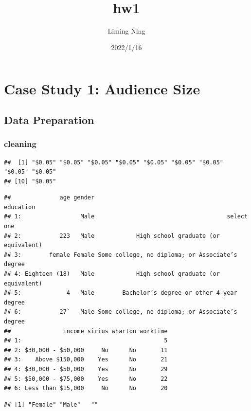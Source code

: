 \documentclass[
  12pt,
]{article}
\title{hw1}
\author{Liming Ning}
\date{2022/1/16}
\begin{document}
\maketitle

{
\setcounter{tocdepth}{2}
\tableofcontents
}
\hypertarget{case-study-1-audience-size}{%
\section{Case Study 1: Audience Size}\label{case-study-1-audience-size}}

\hypertarget{data-preparation}{%
\subsection{Data Preparation}\label{data-preparation}}

\hypertarget{cleaning}{%
\subsubsection{cleaning}\label{cleaning}}

\begin{verbatim}
##  [1] "$0.05" "$0.05" "$0.05" "$0.05" "$0.05" "$0.05" "$0.05" "$0.05" "$0.05"
## [10] "$0.05"
\end{verbatim}

\begin{verbatim}
##              age gender                                       education
## 1:                 Male                                      select one
## 2:           223   Male            High school graduate (or equivalent)
## 3:        female Female Some college, no diploma; or Associate’s degree
## 4: Eighteen (18)   Male            High school graduate (or equivalent)
## 5:             4   Male        Bachelor’s degree or other 4-year degree
## 6:           27`   Male Some college, no diploma; or Associate’s degree
##               income sirius wharton worktime
## 1:                                         5
## 2: $30,000 - $50,000     No      No       11
## 3:    Above $150,000    Yes      No       21
## 4: $30,000 - $50,000    Yes      No       29
## 5: $50,000 - $75,000    Yes      No       22
## 6: Less than $15,000     No      No       20
\end{verbatim}

\begin{verbatim}
## [1] "Female" "Male"   ""
\end{verbatim}
\end{document}
